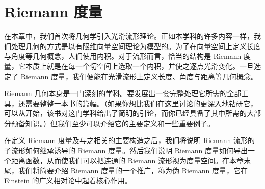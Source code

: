 \documentclass[../main.tex]{subfiles}
\begin{document}
\chapter{Riemann 度量}\label{chapter:ch13-riemannian-metrics}

在本章中，我们首次将几何学引入光滑流形理论。正如本学科的许多内容一样，我们处理几何的方式是以有限维向量空间理论为模型的。为了在向量空间上定义长度与角度等几何概念，人们使用内积。对于流形而言，恰当的结构是 Riemann 度量，它本质上就是在每一个切空间上选取一个内积，并使之逐点光滑变化。一旦选定了 Riemann 度量，我们便能在光滑流形上定义长度、角度与距离等几何概念。

Riemann 几何本身是一门深刻的学科。要发展出一套完整处理它所需的全部工具，还需要整整一本书的篇幅。（如果你想比我们在这里讨论的更深入地钻研它，可以从\cite{LeeRM}开始，该书对这门学科给出了简明的引论，而你已经具备了其中所需的大部分预备知识。）但我们至少可以介绍它的主要定义和一些重要例子。

在定义 Riemann 度量及与之相关的主要构造之后，我们将说明 Riemann 流形的子流形如何继承诱导的 Riemann 度量。然后我们说明 Riemann 度量如何导出一个距离函数，从而使我们可以把连通的 Riemann 流形视为度量空间。在本章末尾，我们将简要介绍 Riemann 度量的一个推广，称为伪 Riemann 度量，它在 Einstein 的广义相对论中起着核心作用。






\end{document}
